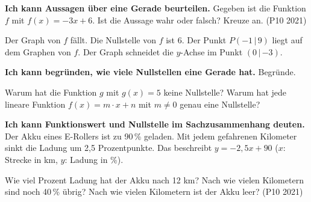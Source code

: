 \begin{aufgabe}{\textbf{Ich kann Aussagen über eine Gerade beurteilen.} Gegeben ist die Funktion $f$ mit $f(x) = -3x + 6$. Ist die Aussage wahr oder falsch? Kreuze an. (P10 2021)}
\begin{teile}
\teil Der Graph von $f$ fällt. \quad {}
\teil Die Nullstelle von $f$ ist 6. \quad {}
\teil Der Punkt $P(-1\,|\,9)$ liegt auf dem Graphen von $f$. \quad {}
\teil Der Graph schneidet die $y$-Achse im Punkt $(0\,|\,{-3})$. \quad {}
\end{teile}
\end{aufgabe}

\begin{aufgabe}{\textbf{Ich kann begründen, wie viele Nullstellen eine Gerade hat.} Begründe.}
\begin{teile}
\teil Warum hat die Funktion $g$ mit $g(x) = 5$ keine Nullstelle?
\teil Warum hat jede lineare Funktion $f(x) = m \cdot x + n$ mit $m \neq 0$ genau eine Nullstelle?
\end{teile}
\end{aufgabe}

\begin{aufgabe}{\textbf{Ich kann Funktionswert und Nullstelle im Sachzusammenhang deuten.} Der Akku eines E-Rollers ist zu 90\,\% geladen. Mit jedem gefahrenen Kilometer sinkt die Ladung um 2,5 Prozentpunkte. Das beschreibt $y = -2{,}5x + 90$ ($x$: Strecke in km, $y$: Ladung in \%).}
\begin{teile}
\teil Wie viel Prozent Ladung hat der Akku nach 12 km?
\teil Nach wie vielen Kilometern sind noch 40\,\% übrig?
\teil Nach wie vielen Kilometern ist der Akku leer? (P10 2021)
\end{teile}
\end{aufgabe}
